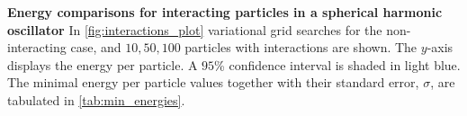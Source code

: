 \textbf{Energy comparisons for interacting particles in a spherical harmonic oscillator}
In \autoref{fig:interactions_plot} variational grid searches for the non-interacting case, and $10, 50, 100$ particles with interactions are shown. The $y$-axis displays the energy per particle. A $95$\% confidence interval is shaded in light blue. The minimal energy per particle values together with their standard error, $\sigma$, are tabulated in \autoref{tab:min_energies}. 
\begin{figure}[!htb]
\centering
{}
\qquad
{}
\qquad

\end{figure}
